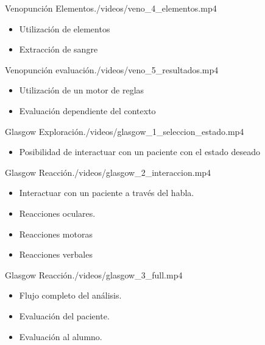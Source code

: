 \begin{step}{Venopunción Elementos}{./videos/veno_4_elementos.mp4}
\begin{itemize}
    \item Utilización de elementos
    \item Extracción de sangre
\end{itemize}
\end{step}


\begin{step}{Venopunción evaluación}{./videos/veno_5_resultados.mp4}
\begin{itemize}
    \item Utilización de un motor de reglas
    \item Evaluación dependiente del contexto
\end{itemize}
\end{step}


\begin{step}{Glasgow Exploración}{./videos/glasgow_1_seleccion_estado.mp4}
\begin{itemize}
    \item Posibilidad de interactuar con un paciente con el estado deseado
\end{itemize}
\end{step}

\begin{step}{Glasgow Reacción}{./videos/glasgow_2_interaccion.mp4}
\begin{itemize}
    \item Interactuar con un paciente a través del habla.
    \item Reacciones oculares.
    \item Reacciones motoras
    \item Reacciones verbales
\end{itemize}
\end{step}


\begin{step}{Glasgow Reacción}{./videos/glasgow_3_full.mp4}
\begin{itemize}
    \item Flujo completo del análisis.
    \item Evaluación del paciente.
    \item Evaluación al alumno.
\end{itemize}
\end{step}
